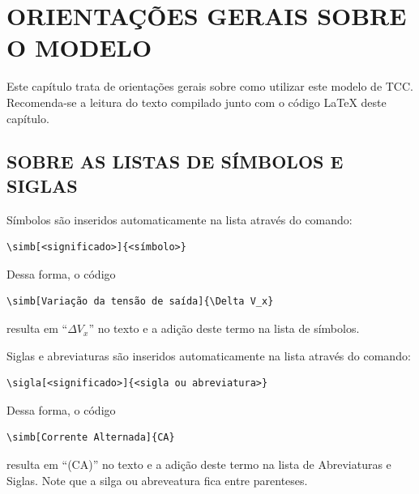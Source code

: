 \chapter{ORIENTAÇÕES GERAIS SOBRE O MODELO}
\label{chap:orientações}

Este capítulo trata de orientações gerais sobre como utilizar este modelo de TCC. Recomenda-se a leitura do texto compilado junto com o código \LaTeX{} deste capítulo.

\section{SOBRE AS LISTAS DE SÍMBOLOS E SIGLAS} 
\label{sec:simbsiglas}

Símbolos são inseridos automaticamente na lista através do comando:

\begin{verbatim}
\simb[<significado>]{<símbolo>}
\end{verbatim}



Dessa forma, o código

\begin{verbatim}
\simb[Variação da tensão de saída]{\Delta V_x}
\end{verbatim}

\noindent resulta em ``$\Delta V_x$'' no texto e a adição deste termo na lista de símbolos.

Siglas e abreviaturas são inseridos automaticamente na lista através do comando:

\begin{verbatim}
\sigla[<significado>]{<sigla ou abreviatura>}
\end{verbatim}

Dessa forma, o código

\begin{verbatim}
\simb[Corrente Alternada]{CA}
\end{verbatim}

\noindent resulta em ``(CA)'' no texto e a adição deste termo na lista de Abreviaturas e Siglas. Note que a silga ou abreveatura fica entre parenteses.


